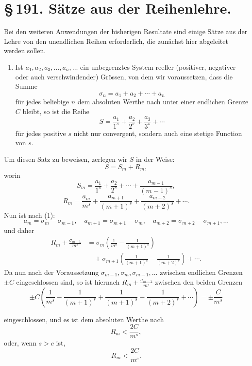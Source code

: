 \documentclass[11pt]{article}
\begin{document}
\section*{\S\,191. Sätze aus der Reihenlehre.}

Bei den weiteren Anwendungen der bisherigen Resultate sind einige Sätze aus der Lehre von den unendlichen Reihen erforderlich, die zunächst hier abgeleitet werden sollen.

\begin{enumerate}[label=\textbf{\arabic*.},leftmargin=2.2em]
\item Ist $a_1,a_2,a_3,\ldots,a_n,\ldots$ ein unbegrenztes System reeller (positiver, negativer oder auch verschwindender) Grössen, von dem wir voraussetzen, dass die Summe
\begin{equation}
\sigma_n=a_1+a_2+\cdots+a_n
\tag{1}
\end{equation}
für jedes beliebige $n$ dem absoluten Werthe nach unter einer endlichen Grenze $C$ bleibt, so ist die Reihe
\begin{equation}
S=\frac{a_1}{1^s}+\frac{a_2}{2^s}+\frac{a_3}{3^s}+\cdots
\tag{2}
\end{equation}
für jedes positive $s$ nicht nur convergent, sondern auch eine stetige Function von $s$.
\end{enumerate}

Um diesen Satz zu beweisen, zerlegen wir $S$ in der Weise:
\[
S=S_m+R_m,
\]
worin
\[
S_m=\frac{a_1}{1^s}+\frac{a_2}{2^s}+\cdots+\frac{a_{m-1}}{(m-1)^s},
\]
\[
R_m=\frac{a_m}{m^s}+\frac{a_{m+1}}{(m+1)^s}+\frac{a_{m+2}}{(m+2)^s}+\cdots .
\]
Nun ist nach (1):
\[
a_m=\sigma_m-\sigma_{m-1},\quad a_{m+1}=\sigma_{m+1}-\sigma_m,\quad
a_{m+2}=\sigma_{m+2}-\sigma_{m+1},\ldots
\]
und daher
\[
\begin{aligned}
R_m+\frac{\sigma_{m-1}}{m^s}
&=\sigma_m\left(\frac1{m^s}-\frac1{(m+1)^s}\right)\\
&\quad+\sigma_{m+1}\left(\frac1{(m+1)^s}-\frac1{(m+2)^s}\right)+\cdots .
\end{aligned}
\]
Da nun nach der Voraussetzung $\sigma_{m-1},\sigma_m,\sigma_{m+1},\ldots$ zwischen endlichen Grenzen $\pm C$ eingeschlossen sind, so ist hiernach $R_m+\frac{\sigma_{m-1}}{m^s}$ zwischen den beiden Grenzen
\[
\pm C\left(\frac1{m^s}-\frac1{(m+1)^s}+\frac1{(m+1)^s}-\frac1{(m+2)^s}+\cdots\right)
=\pm\frac{C}{m^s}
\]

eingeschlossen, und es ist dem absoluten Werthe nach
\[
R_m<\frac{2C}{m^s},
\]
oder, wenn $s>c$ ist,
\[
R_m<\frac{2C}{m^c}.
\]
\end{document}
